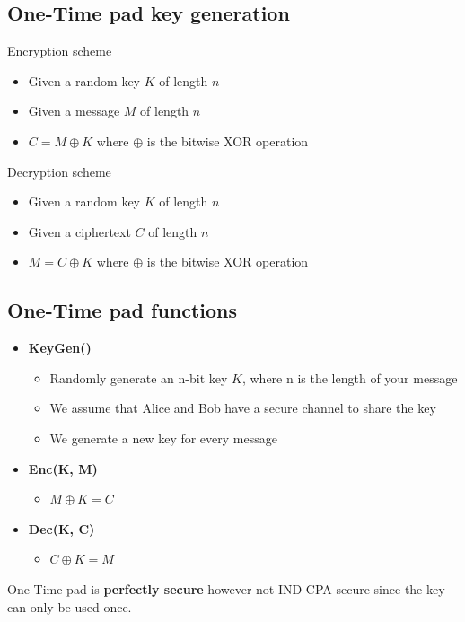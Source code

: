 \documentclass[12pt,a4paper]{article}
\begin{document}
\subsection{One-Time pad key generation}
\noindent Encryption scheme
\begin{itemize}
    \item Given a random key $K$ of length $n$
    \item Given a message $M$ of length $n$
    \item $C = M \oplus K$ where $\oplus$ is the bitwise XOR operation
\end{itemize}

\noindent Decryption scheme
\begin{itemize}
    \item Given a random key $K$ of length $n$
    \item Given a ciphertext $C$ of length $n$
    \item $M = C \oplus K$ where $\oplus$ is the bitwise XOR operation
\end{itemize}

\subsection{One-Time pad functions}
\begin{itemize}
    \item \textbf{KeyGen()}
    \begin{itemize}
        \item Randomly generate an n-bit key $K$, where n is the length of your message
        \item We assume that Alice and Bob have a secure channel to share the key
        \item We generate a new key for every message
    \end{itemize}
    \item \textbf{Enc(K, M)}
    \begin{itemize}
        \item $M \oplus K = C$
    \end{itemize}
    \item \textbf{Dec(K, C)}
    \begin{itemize}
        \item $C \oplus K = M$
    \end{itemize}
\end{itemize}

\noindent One-Time pad is \textbf{perfectly secure} however not IND-CPA secure since the key can only be used once.
\end{document}
